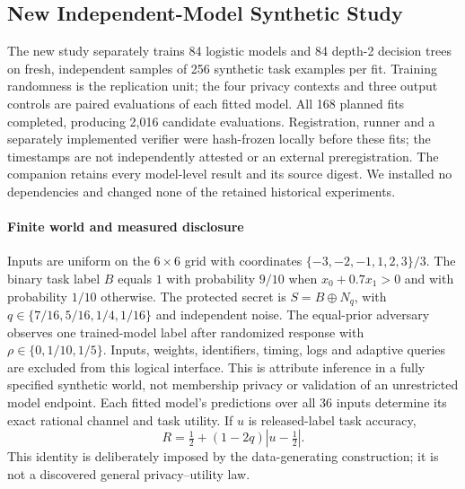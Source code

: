 \subsection{New Independent-Model Synthetic Study}
\label{sec:independent-study}
The new study separately trains 84 logistic models and 84 depth-2 decision
trees on fresh, independent samples of 256 synthetic task examples per fit.
Training randomness is the replication unit; the four privacy contexts and
three output controls are paired evaluations of each fitted model. All 168
planned fits completed, producing 2,016 candidate evaluations. Registration,
runner and a separately implemented verifier were hash-frozen locally before these fits;
the timestamps are not independently attested or an external preregistration.
The companion  retains every
model-level result and its source digest. We installed no dependencies and
changed none of the retained historical experiments.

\paragraph{Finite world and measured disclosure}
Inputs are uniform on the $6\times6$ grid with coordinates
$\{-3,-2,-1,1,2,3\}/3$. The binary task label $B$ equals $1$ with
probability $9/10$ when $x_0+0.7x_1>0$ and with probability $1/10$
otherwise. The protected secret
is $S=B\oplus N_q$, with $q\in\{7/16,5/16,1/4,1/16\}$ and independent noise.
The equal-prior adversary observes one trained-model label after randomized
response with $\rho\in\{0,1/10,1/5\}$. Inputs, weights, identifiers, timing,
logs and adaptive queries are excluded from this logical interface. This is
attribute inference in a fully specified synthetic world, not membership
privacy or validation of an unrestricted model endpoint.
Each fitted model's predictions over all 36 inputs determine its exact
rational channel and task utility. If $u$ is released-label task accuracy,
\[
 R=\tfrac12+(1-2q)|u-\tfrac12|.
\]
This identity is deliberately imposed by the data-generating construction;
it is not a discovered general privacy--utility law.

